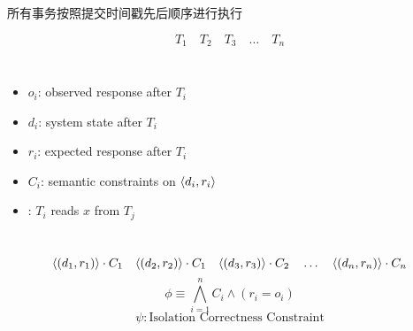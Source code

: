 
\begin{frame}{}
	\begin{center}

		\pause
		\vspace{0.50cm}
	\end{center}
\end{frame}

\begin{frame}{}
	\begin{center}

		\pause
		\vspace{0.50cm}
		 所有事务按照提交时间戳先后顺序进行执行
	\end{center}
\end{frame}

\begin{frame}{}
	\[
		T_{1}\quad T_{2}\quad T_{3}\quad \ldots\quad T_{n}
	\]
	\begin{columns}
		  \begin{itemize}
				\item $o_{i}$: observed response after $T_{i}$
				\item $d_{i}$: system state after $T_{i}$
				\item $r_{i}$: expected response after $T_{i}$
				\item $C_{i}$: semantic constraints on $\langle d_{i}, r_{i}\rangle$
				\item {}: $T_{i}$ reads $x$ from $T_{j}$
			\end{itemize}
	\end{columns}
	\pause
	\[
		\langle(d_{1}, r_{1})\rangle \cdot C_{1} \quad
		\langle(d_{2}, r_{2})\rangle \cdot C_{1} \quad
		\langle(d_{3}, r_{3})\rangle \cdot C_{2} \quad\ldots\quad
		\langle(d_{n}, r_{n})\rangle \cdot C_{n}
	\]
	\pause
	\[
		\phi \equiv \bigwedge_{i=1}^{n} C_{i} \land (r_{i} = o_{i})
	\]
	\pause
	\[
		\psi: \text{Isolation Correctness Constraint}
	\]
\end{frame}

